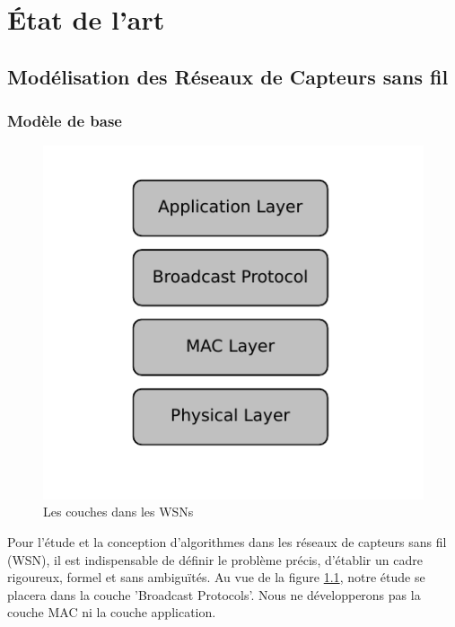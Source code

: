 
\chapter{État de l'art}\label{etat_art}




\section{Modélisation des Réseaux de Capteurs sans fil}

\subsection{Modèle de base}

\begin{figure}[h]
\centering
\includegraphics[scale=0.9]{Etat_de_l'art/source/layer.pdf}
\caption{\label{Layer} Les couches dans les WSNs}
\end{figure}

Pour l'étude et la conception d'algorithmes dans les réseaux de capteurs sans fil (WSN), il est indispensable de définir le problème précis, d'établir un cadre rigoureux, formel et sans ambiguïtés. Au vue de la figure \ref{Layer}, notre étude se placera dans la couche 'Broadcast Protocols'. Nous ne développerons pas la couche MAC ni la couche application.\\

